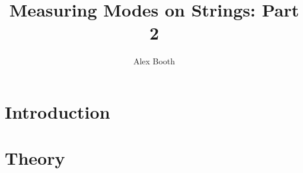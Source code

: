 \documentclass[11pt]{article}
\title{Measuring Modes on Strings: Part 2}
\author{Alex Booth}
\begin{document}
    \maketitle

    \section{Introduction}

    \section{Theory}

    
\end{document}

